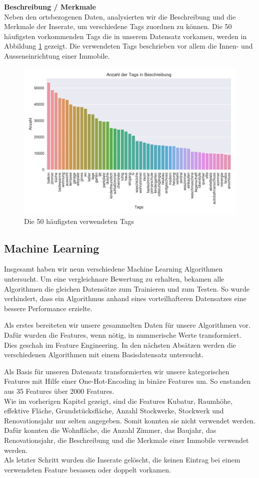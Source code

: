 \textbf{Beschreibung / Merkmale}\\
Neben den ortsbezogenen Daten, analysierten wir die Beschreibung und die Merkmale der Inserate, um verschiedene Tags zuordnen zu können. Die 50 häufigsten vorkommenden Tags die in unserem Datensatz vorkamen, werden in Abbildung \ref{fig:tags} gezeigt. Die verwendeten Tags beschrieben vor allem die Innen- und Ausseneinrichtung einer Immobile.
%
\begin{figure}[ht]
\centering
\includegraphics[width=\textwidth]{images/tags.png}
\caption[Die 50 häufigsten verwendeten Tags]{Die 50 häufigsten verwendeten Tags}%
\label{fig:tags}
\end{figure}

\subsection{Machine Learning}
Insgesamt haben wir neun verschiedene Machine Learning Algorithmen untersucht. Um eine vergleichnare Bewertung zu erhalten, bekamen alle Algorithmen die gleichen Datensätze zum Trainieren und zum Testen. So wurde verhindert, dass ein Algorithmus anhand eines vorteilhafteren Datensatzes eine bessere Performance erzielte. 

Als erstes bereiteten wir unsere gesammelten Daten für unsere Algorithmen vor. Dafür wurden die Features, wenn nötig, in nummerische Werte transformiert. Dies geschah im Feature Engineering. In den nächsten Absätzen werden die verschiedenen Algorithmen mit einem Basisdatensatz untersucht.

Als Basis für unseren Datensatz transformierten wir unsere kategorischen Features mit Hilfe einer One-Hot-Encoding in binäre Features um. So enstanden aus 35 Features über 2000 Features.\\
Wie im vorherigen Kapitel gezeigt, sind die Features Kubatur, Raumhöhe, effektive Fläche, Grundstücksfläche, Anzahl Stockwerke, Stockwerk und Renovationsjahr nur selten angegeben. Somit konnten sie nicht verwendet werden. Dafür konnten die Wohnfläche, die Anzahl Zimmer, das Baujahr, das Renovationsjahr, die Beschreibung und die Merkmale einer Immobile verwendet werden.\\
Als letzter Schritt wurden die Inserate gelöscht, die keinen Eintrag bei einem verwendeten Feature besassen oder doppelt vorkamen.

